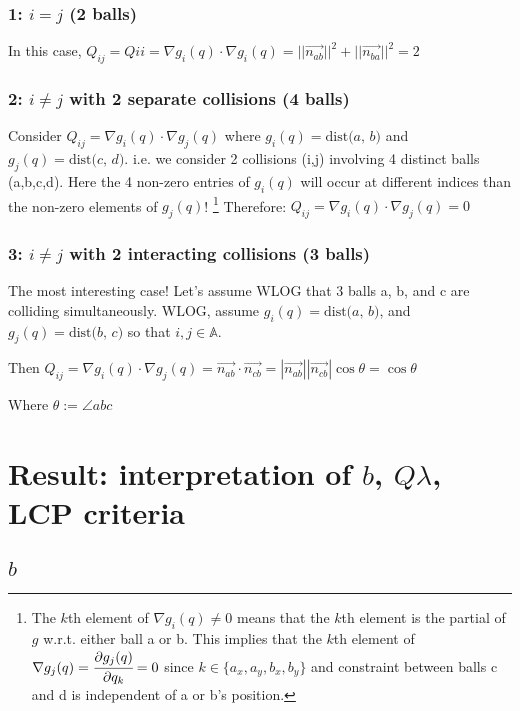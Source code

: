 \documentclass[12pt]{article}
\newcommand{\pd}[2]{\cfrac{\partial{#1}}{\partial{#2}}}
\newcommand{\dist}[2]{\text{dist(} #1 \text{, } #2 \text{)}}
\begin{document}
\subsubsection*{1: $i = j$ (2 balls)} 

In this case, $Q_{ij} = Q{ii} = \nabla g_i(q) \cdot \nabla g_i(q) = ||\vec{n_{ab}}||^2 + ||\vec{n_{ba}}||^2 = 2$

\subsubsection*{2: $i \neq j$ with 2 separate collisions (4 balls)}

Consider $Q_{ij} = \nabla g_i(q) \cdot \nabla g_j(q)$
where $g_i(q) = \dist{a}{b}$ and $g_j(q) = \dist{c}{d}$. 
i.e. we consider 2 collisions (i,j) involving 4 distinct balls (a,b,c,d).
Here the 4 non-zero entries of
$g_i(q)$ will occur at different indices than the non-zero elements of $g_j(q)$!
\footnote{The $k$th element of $\nabla g_i(q) \neq 0$ means that the $k$th element
is the partial of $g$ w.r.t. either ball a or b. This implies that the $k$th element
of $\nabla g_j(q) = \pd{g_j(q)}{q_k} = 0$ since $k \in \{a_x, a_y, b_x, b_y\}$ and constraint between balls c and d is independent
of a or b's position.}
Therefore: $Q_{ij} = \nabla g_i(q) \cdot \nabla g_j(q) = 0$

\subsubsection*{3: $i \neq j$ with 2 interacting collisions (3 balls)}

The most interesting case! Let's assume WLOG that 3 balls a, b, and c are colliding simultaneously.
WLOG, assume $g_i(q) = \dist{a}{b}$, and $g_j(q) = \dist{b}{c}$ so that $i, j \in \mathbb{A}$.

Then
$Q_{ij}
    = \nabla g_i(q) \cdot \nabla g_j(q)
    = \vec{n_{ab}} \cdot \vec{n_{cb}}
    = |\vec{n_{ab}}||\vec{n_{cb}}|\cos{\theta}
    = \cos{\theta}
$

Where $\theta := \angle abc$

\section*{Result: interpretation of $b$, $Q \lambda$, LCP criteria}

\subsection*{$b$}
\end{document}
